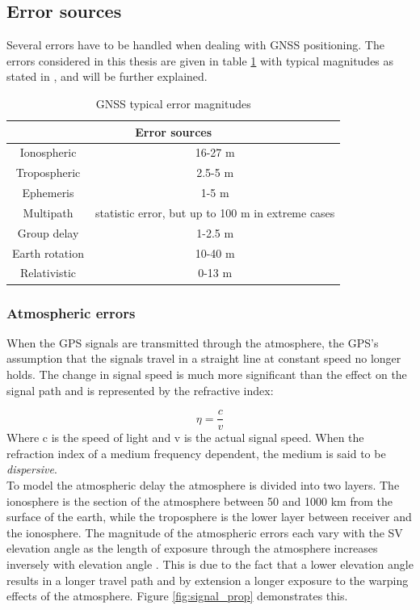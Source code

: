 \subsection{Error sources}
\label{sec:errors}
Several errors have to be handled when dealing with GNSS positioning. The errors considered in this thesis are given in table \ref{tab:errors} with typical magnitudes as stated in \cite{schuler2001ground, misra2006global, pascual2007introducing, groves2013principles, matsakis2007timing}, and will be further explained.
\begin{table}[!htbp]
    \centering
    \begin{tabular}{|c|c|}
        \multicolumn{2}{c}{\textbf{Error sources}}\\\hline
        Ionospheric     & 16-27 m\\\hline
        Tropospheric    & 2.5-5 m\\\hline
        Ephemeris       & 1-5 m\\\hline
        Multipath       & statistic error, but up to 100 m in extreme cases\\\hline
        Group delay     & 1-2.5 m \\\hline
        Earth rotation  & 10-40 m\\\hline
        Relativistic    & 0-13 m\\\hline
    \end{tabular}
    \caption{GNSS typical error magnitudes}
    \label{tab:errors}
\end{table}
\subsubsection{Atmospheric errors}
When the GPS signals are transmitted through the atmosphere, the GPS's assumption that the signals travel in a straight line at constant speed no longer holds. The change in signal speed is much more significant than the effect on the signal path \cite{farrell2008aided} and is represented by the refractive index:

\begin{equation*}
	\eta = \frac{c}{v}
\end{equation*}
Where c is the speed of light and v is the actual signal speed. When the refraction index of a medium frequency dependent, the medium is said to be \textit{dispersive}.\\

To model the atmospheric delay the atmosphere is divided into two layers. The ionosphere is the section of the atmosphere between 50 and 1000 km from the surface of the earth, while the troposphere is the lower layer between receiver and the ionosphere. The magnitude of the atmospheric errors each vary with the SV elevation angle as the length of exposure through the atmosphere increases inversely with elevation angle \cite{farrell2008aided, groves2013principles}. This is due to the fact that a lower elevation angle results in a longer travel path and by extension a longer exposure to the warping effects of the atmosphere. Figure \ref{fig:signal_prop} demonstrates this.\\

